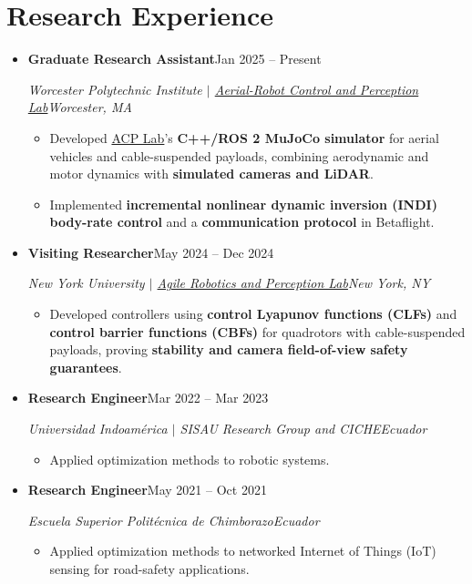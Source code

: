 \documentclass[letterpaper,11pt]{article}
\newcommand{\resumeItem}[1]{
  \item {\small #1\par}\vspace{-2pt}
}
\newcommand{\resumeSubheading}[4]{
  \vspace{-2pt}\item
    \textbf{#1}\enspace\textbar\enspace #2\\
    {\small\textit{#3\enspace\textbar\enspace #4}\par}\vspace{-5pt}
}
\newcommand{\resumeSubHeadingListStart}{\begin{itemize}[leftmargin=0.15in, label={}, topsep=3pt]}
\newcommand{\resumeSubHeadingListEnd}{\end{itemize}}
\newcommand{\resumeItemListStart}{\begin{itemize}}
\newcommand{\resumeItemListEnd}{\end{itemize}\vspace{-5pt}}
\begin{document}
\section{Research Experience}
\resumeSubHeadingListStart
\resumeSubheading{Graduate Research Assistant}{Jan 2025 -- Present}
{Worcester Polytechnic Institute $|$ \href{https://acp-lab.github.io/acplab-web/}{Aerial-Robot Control and Perception Lab}}{Worcester, MA}
\resumeItemListStart
\resumeItem{Developed \href{https://acp-lab.github.io/acplab-web/}{ACP Lab}'s \textbf{C++/ROS 2 MuJoCo simulator} for aerial vehicles and cable-suspended payloads, combining aerodynamic and motor dynamics with \textbf{simulated cameras and LiDAR}.}
\resumeItem{Implemented \textbf{incremental nonlinear dynamic inversion (INDI) body-rate control} and a \textbf{communication protocol} in Betaflight.}
\resumeItemListEnd
\resumeSubheading{Visiting Researcher}{May 2024 -- Dec 2024}
{New York University $|$ \href{https://arplaboratory.github.io/}{Agile Robotics and Perception Lab}}{New York, NY}
\resumeItemListStart
\resumeItem{Developed controllers using \textbf{control Lyapunov functions (CLFs)} and \textbf{control barrier functions (CBFs)} for quadrotors with cable-suspended payloads, proving \textbf{stability and camera field-of-view safety guarantees}.}
\resumeItemListEnd
\resumeSubheading{Research Engineer}{Mar 2022 -- Mar 2023}
{Universidad Indoam\'erica $|$ SISAU Research Group and CICHE}{Ecuador}
\resumeItemListStart
\resumeItem{Applied optimization methods to robotic systems.}
\resumeItemListEnd
\resumeSubheading{Research Engineer}{May 2021 -- Oct 2021}
{Escuela Superior Polit\'ecnica de Chimborazo}{Ecuador}
\resumeItemListStart
\resumeItem{Applied optimization methods to networked Internet of Things (IoT) sensing for road-safety applications.}
\resumeItemListEnd
\resumeSubHeadingListEnd
\end{document}
